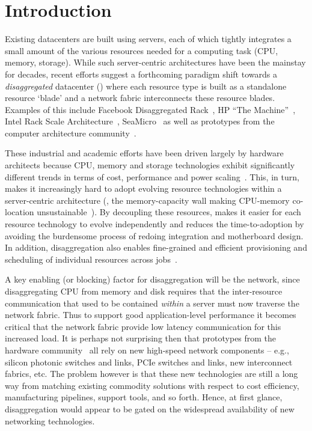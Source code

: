 \vspace{-0.1in}
\section{Introduction}
\label{sec:intro}
\vspace{-0.05in}
Existing datacenters are built using servers, each of which tightly integrates a small amount of the various resources needed for a computing task (CPU, memory, storage). While such server-centric architectures have been the mainstay for decades, recent efforts suggest a forthcoming paradigm shift towards a {\em disaggregated} datacenter (\dis) where each resource type is built as a standalone resource `blade' and a network fabric interconnects these resource blades. Examples of this include Facebook Disaggregated Rack~\cite{fdr}, HP ``The Machine''~\cite{hptm}, Intel Rack Scale Architecture~\cite{rsa}, SeaMicro~\cite{seamicro} as well as prototypes from the computer architecture community~\cite{firebox, sonuma, ddcHwDesign1}. 

These industrial and academic efforts have been driven largely by hardware architects because CPU, memory and storage technologies exhibit significantly different trends in terms of cost, performance and power scaling~\cite{memristors,nvram,reg-ex-hardware,gpus}. This, in turn, makes it increasingly hard to adopt evolving resource technologies within a server-centric architecture (\eg, the memory-capacity wall making CPU-memory co-location unsustainable~\cite{memwall}). By decoupling these resources, \dis makes it easier for each resource technology to evolve independently and reduces the time-to-adoption by avoiding the burdensome process of redoing integration and motherboard design. In addition, disaggregation also enables fine-grained and efficient provisioning and scheduling of individual resources across jobs~\cite{hotnets}. 


A key enabling (or blocking) factor for disaggregation will be the network, since disaggregating CPU from memory and disk requires that the inter-resource communication that used to be contained \emph{within} a server must now traverse the network fabric. 
Thus to support good application-level performance it becomes critical that the network fabric provide low latency communication for this increased load. 
It is perhaps not surprising then that prototypes from the hardware community~\cite{rsa, fdr, hptm, seamicro, firebox, sonuma, ddcHwDesign1} all rely on new high-speed network components -- e.g., silicon photonic switches and links, PCIe switches and links, new interconnect fabrics, etc.
The problem however is that these new technologies are still a long way from matching existing commodity solutions with respect to cost efficiency,  manufacturing pipelines, support tools, and so forth. Hence, at first glance, disaggregation would appear to be gated on the widespread availability of new networking technologies. 

